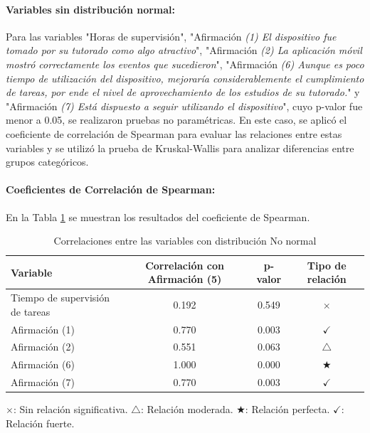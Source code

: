 \documentclass[a4paper,fleqn]{cas-sc}
\begin{document}
					\paragraph{\textbf{Variables sin distribución normal:}}
					Para las variables "Horas de supervisión", "Afirmación \textit{(1) El dispositivo fue tomado por su tutorado como algo atractivo}", "Afirmación \textit{(2) La aplicación móvil mostró correctamente los eventos que sucedieron}", "Afirmación \textit{(6) Aunque es poco tiempo de utilización del dispositivo, mejoraría considerablemente el cumplimiento de tareas, por ende el nivel de aprovechamiento de los estudios de su tutorado.}" y "Afirmación \textit{(7) Está dispuesto a seguir utilizando el dispositivo}", cuyo p-valor fue menor a 0.05, se realizaron pruebas no paramétricas. En este caso, se aplicó el coeficiente de correlación de Spearman para evaluar las relaciones entre estas variables y se utilizó la prueba de Kruskal-Wallis para analizar diferencias entre grupos categóricos.
					
					\paragraph*{Coeficientes de Correlación de Spearman: }
					En la Tabla \ref{table:Spearman-Correlation} se muestran los resultados del coeficiente de Spearman.
						
					\begin{table}[h!]
						\centering
						\caption{Correlaciones entre las variables con distribución No normal}
						\begin{tabularx}{0.85\textwidth}{Xccc}
							\toprule
							\textbf{Variable} & \textbf{Correlación con Afirmación (5)} &  \textbf{p-valor} & \textbf{Tipo de relación} \\
							\midrule
							Tiempo de supervisión de tareas & 0.192 & 0.549 & \(\times\)  \\ %
							Afirmación (1) & 0.770 & 0.003 & \(\checkmark\) \\ %
							Afirmación (2) & 0.551 & 0.063 & \(\bigtriangleup\)  \\ %
							Afirmación (6) & 1.000 & 0.000 & \(\bigstar\)  \\ %
							Afirmación (7) & 0.770 & 0.003 & \(\checkmark\)  \\ %
							\bottomrule
						\end{tabularx}
						\label{table:Spearman-Correlation}
						\vspace{0.3em} %
						\parbox{0.75\textwidth}{\footnotesize 
							\(\times\): Sin relación significativa. \(\bigtriangleup\): Relación moderada. \(\bigstar\): Relación perfecta. \(\checkmark\): Relación fuerte.
						}
					\end{table}
					
\end{document}
